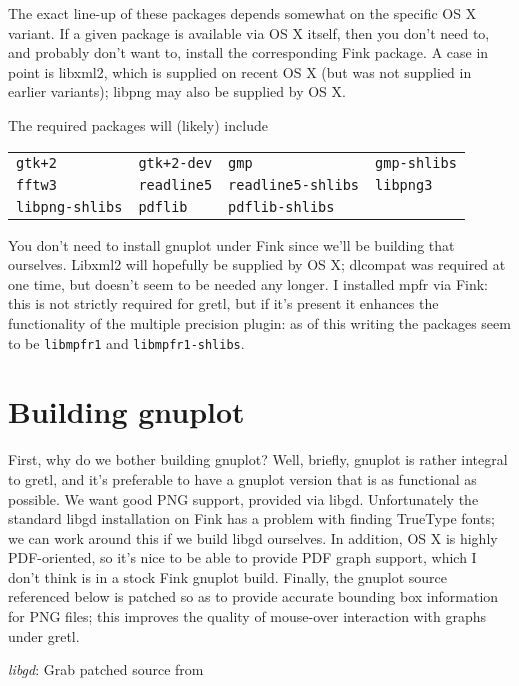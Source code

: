 \documentclass{article}
\begin{document}
The exact line-up of these packages depends somewhat on the specific
OS X variant.  If a given package is available via OS X itself, then
you don't need to, and probably don't want to, install the
corresponding Fink package.  A case in point is libxml2, which is
supplied on recent OS X (but was not supplied in earlier variants);
libpng may also be supplied by OS X.

The required packages will (likely) include

\begin{center}
{\small
\begin{tabular}{llll}
\texttt{gtk+2} & \texttt{gtk+2-dev} & \texttt{gmp} & 
\texttt{gmp-shlibs} \\
\texttt{fftw3} & \texttt{readline5} & \texttt{readline5-shlibs} 
& \texttt{libpng3} \\
 \texttt{libpng-shlibs} & \texttt{pdflib} & \texttt{pdflib-shlibs}
\end{tabular}
}
\end{center}

You don't need to install gnuplot under Fink since we'll be building
that ourselves.  Libxml2 will hopefully be supplied by OS X; dlcompat
was required at one time, but doesn't seem to be needed any longer.  I
installed mpfr via Fink: this is not strictly required for gretl, but
if it's present it enhances the functionality of the multiple
precision plugin: as of this writing the packages seem to be
\texttt{libmpfr1} and \texttt{libmpfr1-shlibs}.


\section{Building gnuplot}
\label{sec:gpbuild}

First, why do we bother building gnuplot?  Well, briefly, gnuplot is
rather integral to gretl, and it's preferable to have a gnuplot
version that is as functional as possible.  We want good PNG support,
provided via libgd.  Unfortunately the standard libgd installation on
Fink has a problem with finding TrueType fonts; we can work around
this if we build libgd ourselves.  In addition, OS X is highly
PDF-oriented, so it's nice to be able to provide PDF graph support,
which I don't think is in a stock Fink gnuplot build.  Finally, the
gnuplot source referenced below is patched so as to provide accurate
bounding box information for PNG files; this improves the quality of
mouse-over interaction with graphs under gretl.

\textit{libgd}: Grab patched source from
\end{document}
